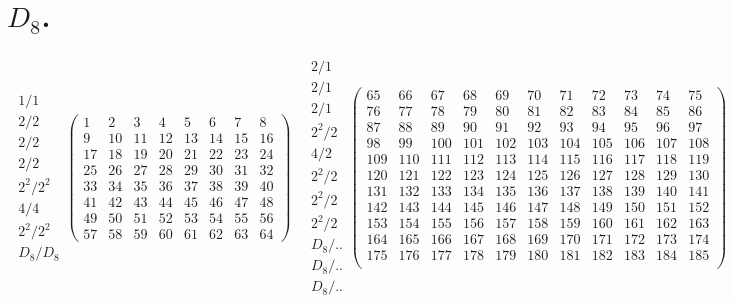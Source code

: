 \documentclass[11pt,a4paper]{amsart}
\begin{document}
\section*{$D_8$.}

\begin{align*}
\begin{array}{c}
1/1\\\hline
2/2\\\hline
2/2\\\hline
2/2\\\hline
2^2/2^2\\\hline
4/4\\\hline
2^2/2^2\\\hline
D_8/D_8
\end{array}%
\left(
\begin{array}{r|r|r|r|r|r|r|r}
1&2&3&4&5&6&7&8\\\hline
9&10&11&12&13&14&15&16\\\hline
17&18&19&20&21&22&23&24\\\hline
25&26&27&28&29&30&31&32\\\hline
33&34&35&36&37&38&39&40\\\hline
41&42&43&44&45&46&47&48\\\hline
49&50&51&52&53&54&55&56\\\hline
57&58&59&60&61&62&63&64
\end{array}
\right)
\quad
\begin{array}{c}
2/1\\\hline
2/1\\\hline
2/1\\\hline
2^2/2\\\hline
4/2\\\hline
2^2/2\\\hline
2^2/2\\\hline
2^2/2\\\hline
D_8/..\\\hline
D_8/..\\\hline
D_8/..
\end{array}%
\left(
\begin{array}{r|r|r|r|r|r|r|r|r|r|r}
65&66&67&68&69&70&71&72&73&74&75\\\hline
76&77&78&79&80&81&82&83&84&85&86\\\hline
87&88&89&90&91&92&93&94&95&96&97\\\hline
98&99&100&101&102&103&104&105&106&107&108\\\hline
109&110&111&112&113&114&115&116&117&118&119\\\hline
120&121&122&123&124&125&126&127&128&129&130\\\hline
131&132&133&134&135&136&137&138&139&140&141\\\hline
142&143&144&145&146&147&148&149&150&151&152\\\hline
153&154&155&156&157&158&159&160&161&162&163\\\hline
164&165&166&167&168&169&170&171&172&173&174\\\hline
175&176&177&178&179&180&181&182&183&184&185\\
\end{array}
\right)
\end{align*}
\end{document}
